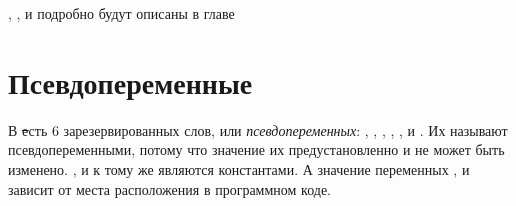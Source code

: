 \documentclass[a4paper,10pt,twoside]{book}
\begin{document}

, ,  и  подробно будут описаны в главе 



\section{Псевдопеременные}


В \st есть 6 зарезервированных слов, или \emph{псевдопеременных}:
, , , , , и .
Их называют псевдопеременными, потому что значение их предустановленно и не может быть изменено.
,  и  к тому же являются константами.
А значение переменных ,  и  зависит от места расположения в программном коде.

\end{document}
